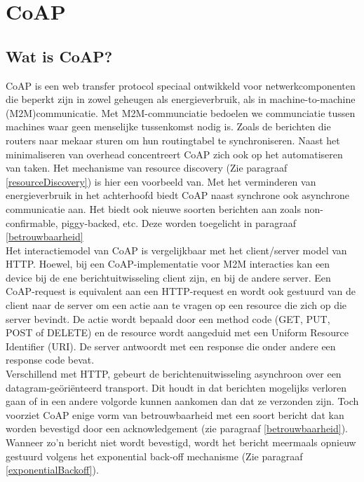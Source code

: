 \chapter{CoAP} \label{CoAP}

\section{Wat is CoAP?}

CoAP is een web transfer protocol speciaal ontwikkeld voor netwerkcomponenten die beperkt zijn in zowel geheugen als energieverbruik, als in machine-to-machine (M2M)communicatie. Met M2M-communciatie bedoelen we communciatie tussen machines waar geen menselijke tussenkomst nodig is. Zoals de berichten die routers naar mekaar sturen om hun routingtabel te synchroniseren. Naast het minimaliseren van overhead concentreert CoAP zich ook op het automatiseren van taken. Het mechanisme van resource discovery (Zie paragraaf \ref{resourceDiscovery}) is hier een voorbeeld van. Met het verminderen van energieverbruik in het achterhoofd biedt CoAP naast synchrone ook asynchrone communicatie aan. Het biedt ook nieuwe soorten berichten aan zoals non-confirmable, piggy-backed, etc. Deze worden toegelicht in paragraaf \ref{betrouwbaarheid}\\


Het interactiemodel van CoAP is vergelijkbaar met het client/server model van HTTP. Hoewel, bij een CoAP-implementatie voor M2M interacties kan een device bij de ene berichtuitwisseling client zijn, en bij de andere server. Een CoAP-request is equivalent aan een HTTP-request en wordt ook gestuurd van de client naar de server om een actie aan te vragen op een resource die zich op die server bevindt. De actie wordt bepaald door een method code (GET, PUT, POST of DELETE) en de resource wordt aangeduid met een Uniform Resource Identifier (URI). De server antwoordt met een response die onder andere een response code bevat.\\

Verschillend met HTTP, gebeurt de berichtenuitwisseling asynchroon over een datagram-ge\"{o}ri\"{e}nteerd transport. Dit houdt in dat berichten mogelijks verloren gaan of in een andere volgorde kunnen aankomen dan dat ze verzonden zijn. Toch voorziet CoAP enige vorm van betrouwbaarheid met een soort bericht dat kan worden bevestigd door een acknowledgement (zie paragraaf \ref{betrouwbaarheid}). Wanneer zo'n bericht niet wordt bevestigd, wordt het bericht meermaals opnieuw gestuurd volgens het exponential back-off mechanisme (Zie paragraaf \ref{exponentialBackoff}).


